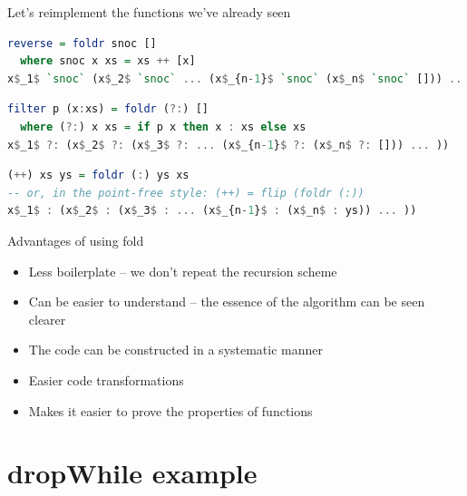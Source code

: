 \documentclass[lualatex]{beamer}
\renewcommand{\_}{\textscale{.6}{\textunderscore}}
\begin{document}
\begin{frame}[fragile]{Let's reimplement the functions we've already seen}
\begin{lstlisting}[language=Haskell, morekeywords={foldr}]
reverse = foldr snoc []
  where snoc x xs = xs ++ [x]
x$_1$ `snoc` (x$_2$ `snoc` ... (x$_{n-1}$ `snoc` (x$_n$ `snoc` [])) ... )
\end{lstlisting}
\pause
\begin{lstlisting}[language=Haskell, morekeywords={foldr}]
filter p (x:xs) = foldr (?:) []
  where (?:) x xs = if p x then x : xs else xs
x$_1$ ?: (x$_2$ ?: (x$_3$ ?: ... (x$_{n-1}$ ?: (x$_n$ ?: [])) ... ))
\end{lstlisting}
\pause
\begin{lstlisting}[language=Haskell, morekeywords={foldr}]
(++) xs ys = foldr (:) ys xs
-- or, in the point-free style: (++) = flip (foldr (:))
x$_1$ : (x$_2$ : (x$_3$ : ... (x$_{n-1}$ : (x$_n$ : ys)) ... ))
\end{lstlisting}
\end{frame}

\begin{frame}[fragile]{Advantages of using fold}
\Large
\begin{itemize}
\item{Less boilerplate -- we don't repeat the recursion scheme}
\item{Can be easier to understand -- the essence of the algorithm can be seen clearer} %
\item{The code can be constructed in a systematic manner}
\item{Easier code transformations}
\item{Makes it easier to prove the properties of functions}
\end{itemize}
\end{frame}

\section{dropWhile example}

\end{document}
